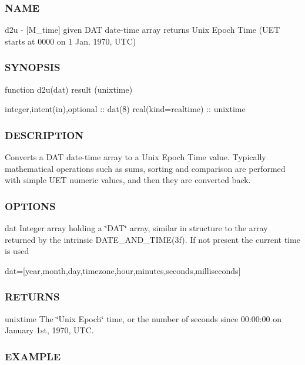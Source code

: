 \subsubsection*{N\+A\+ME}

d2u -\/ \mbox{[}M\+\_\+time\mbox{]} given D\+AT date-\/time array returns Unix Epoch Time (U\+ET starts at 0000 on 1 Jan. 1970, U\+TC) 

\subsubsection*{S\+Y\+N\+O\+P\+S\+IS}

\begin{DoxyVerb}function d2u(dat) result (unixtime)

   integer,intent(in),optional :: dat(8)
   real(kind=realtime)         :: unixtime
\end{DoxyVerb}


\subsubsection*{D\+E\+S\+C\+R\+I\+P\+T\+I\+ON}

Converts a D\+AT date-\/time array to a Unix Epoch Time value. Typically mathematical operations such as sums, sorting and comparison are performed with simple U\+ET numeric values, and then they are converted back.

\subsubsection*{O\+P\+T\+I\+O\+NS}

dat Integer array holding a \char`\"{}\+D\+A\+T\char`\"{} array, similar in structure to the array returned by the intrinsic D\+A\+T\+E\+\_\+\+A\+N\+D\+\_\+\+T\+I\+M\+E(3f). If not present the current time is used

dat=\mbox{[}year,month,day,timezone,hour,minutes,seconds,milliseconds\mbox{]}

\subsubsection*{R\+E\+T\+U\+R\+NS}

unixtime The \char`\"{}\+Unix Epoch\char`\"{} time, or the number of seconds since 00\+:00\+:00 on January 1st, 1970, U\+TC.

\subsubsection*{E\+X\+A\+M\+P\+LE}

